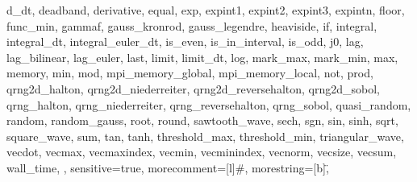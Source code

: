 {{      d_dt,
      deadband,
      derivative,
      equal,
      exp,
      expint1,
      expint2,
      expint3,
      expintn,
      floor,
      func_min,
      gammaf,
      gauss_kronrod,
      gauss_legendre,
      heaviside,
      if,
      integral,
      integral_dt,
      integral_euler_dt,
      is_even,
      is_in_interval,
      is_odd,
      j0,
      lag,
      lag_bilinear,
      lag_euler,
      last,
      limit,
      limit_dt,
      log,
      mark_max,
      mark_min,
      max,
      memory,
      min,
      mod,
      mpi_memory_global,
      mpi_memory_local,
      not,
      prod,
      qrng2d_halton,
      qrng2d_niederreiter,
      qrng2d_reversehalton,
      qrng2d_sobol,
      qrng_halton,
      qrng_niederreiter,
      qrng_reversehalton,
      qrng_sobol,
      quasi_random,
      random,
      random_gauss,
      root,
      round,
      sawtooth_wave,
      sech,
      sgn,
      sin,
      sinh,
      sqrt,
      square_wave,
      sum,
      tan,
      tanh,
      threshold_max,
      threshold_min,
      triangular_wave,
      vecdot,
      vecmax,
      vecmaxindex,
      vecmin,
      vecminindex,
      vecnorm,
      vecsize,
      vecsum,
      wall_time,
},
sensitive=true,
morecomment=[l]{\#},
morestring=[b]\",
}
